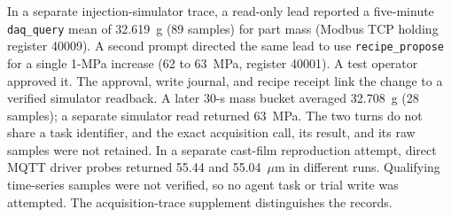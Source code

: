 In a separate injection-simulator trace, a read-only lead reported a five-minute \texttt{daq\_query} mean of 32.619~g (89 samples) for part mass (Modbus TCP holding register 40009). A second prompt directed the same lead to use \texttt{recipe\_propose} for a single 1-MPa increase (62 to 63~MPa, register 40001). A test operator approved it. The approval, write journal, and recipe receipt link the change to a verified simulator readback. A later 30-s mass bucket averaged 32.708~g (28 samples); a separate simulator read returned 63~MPa. The two turns do not share a task identifier, and the exact acquisition call, its result, and its raw samples were not retained. In a separate cast-film reproduction attempt, direct MQTT driver probes returned 55.44 and 55.04~$\mu$m in different runs. Qualifying time-series samples were not verified, so no agent task or trial write was attempted. The acquisition-trace supplement distinguishes the records.


